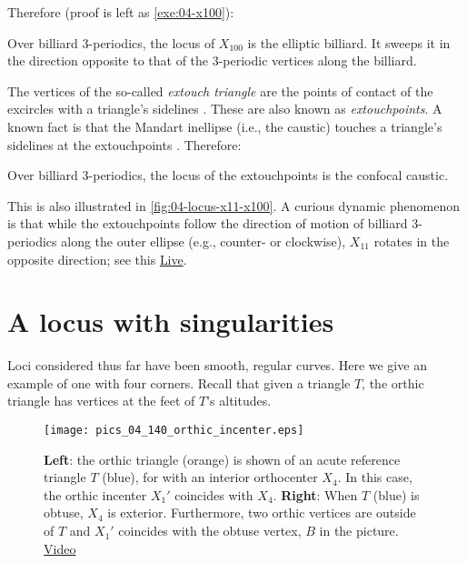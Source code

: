Therefore (proof is left as \cref{exe:04-x100}):

\begin{proposition}
Over billiard 3-periodics, the locus of $X_{100}$ is the elliptic billiard. It sweeps it in the direction opposite to that of the 3-periodic vertices along the billiard.
\label{prop:04-locus-x100}
\end{proposition}

The vertices of the so-called {\em extouch triangle} are the points of contact of the excircles with a triangle's sidelines \cite[Extouch triangle]{mw}. These are also known as {\em extouchpoints}. A known fact is that the Mandart inellipse (i.e., the caustic) touches a triangle's sidelines at the extouchpoints \cite[Mandart inellipse]{mw}. Therefore:

\begin{proposition}
Over billiard 3-periodics, the locus of the extouchpoints is the confocal caustic.
\end{proposition}

This is also illustrated in \cref{fig:04-locus-x11-x100}. A curious dynamic phenomenon is that while the extouchpoints follow the direction of motion of billiard 3-periodics along the outer ellipse (e.g., counter- or clockwise), $X_{11}$ rotates in the opposite direction; see this \href{https://bit.ly/2S2LVqp}{Live}.



\section{A locus with singularities}

Loci considered thus far have been smooth, regular curves. Here we give an example of one with four corners. Recall that given a triangle $T$, the orthic triangle has vertices at the feet of $T$'s altitudes.

\begin{figure}
    \centering
    \texttt{[image: pics\_04\_140\_orthic\_incenter.eps]}
    \caption{\textbf{Left}: the orthic triangle (orange) is shown of an acute reference triangle $T$ (blue), for with an interior orthocenter $X_4$. In this case, the orthic incenter $X_1'$ coincides with $X_4$. \textbf{Right}: When $T$ (blue) is obtuse, $X_4$ is exterior. Furthermore, two orthic vertices are outside of $T$ and $X_1'$ coincides with the obtuse vertex, $B$ in the picture. \href{https://youtu.be/-bLuvICzmqM}{Video}}
    \label{fig:04-orthic-incenter}
\end{figure}

